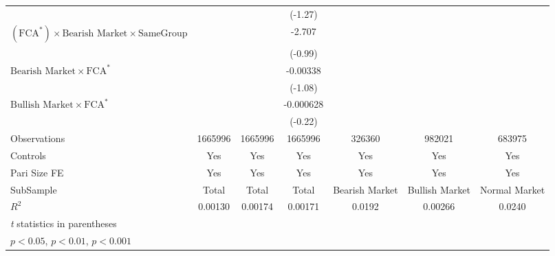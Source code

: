 {\begin{tabular}{l*{6}{c}}
                &                  &                  &  (-1.27)         &                  &                  &                  \\
[1em]
$ (\text{FCA}^*) \times {\text{Bearish Market}} \times {\text{SameGroup} }  $ &                  &                  &   -2.707         &                  &                  &                  \\
                &                  &                  &  (-0.99)         &                  &                  &                  \\
[1em]
$ {\text{Bearish Market} } \times \text{FCA}^*  $ &                  &                  & -0.00338         &                  &                  &                  \\
                &                  &                  &  (-1.08)         &                  &                  &                  \\
[1em]
$ {\text{Bullish Market} } \times \text{FCA}^*   $ &                  &                  &-0.000628         &                  &                  &                  \\
                &                  &                  &  (-0.22)         &                  &                  &                  \\
\hline
Observations    &  1665996         &  1665996         &  1665996         &   326360         &   982021         &   683975         \\
Controls        &      Yes         &      Yes         &      Yes         &      Yes         &      Yes         &      Yes         \\
Pari Size FE    &      Yes         &      Yes         &      Yes         &      Yes         &      Yes         &      Yes         \\
SubSample       &    Total         &    Total         &    Total         &Bearish Market         &Bullish Market         &Normal Market         \\
$ R^2$          &  0.00130         &  0.00174         &  0.00171         &   0.0192         &  0.00266         &   0.0240         \\
\hline\hline
\multicolumn{7}{l}{\footnotesize \textit{t} statistics in parentheses}\\
\multicolumn{7}{l}{\footnotesize \sym{*} \(p<0.05\), \sym{**} \(p<0.01\), \sym{***} \(p<0.001\)}\\
\end{tabular}
}

